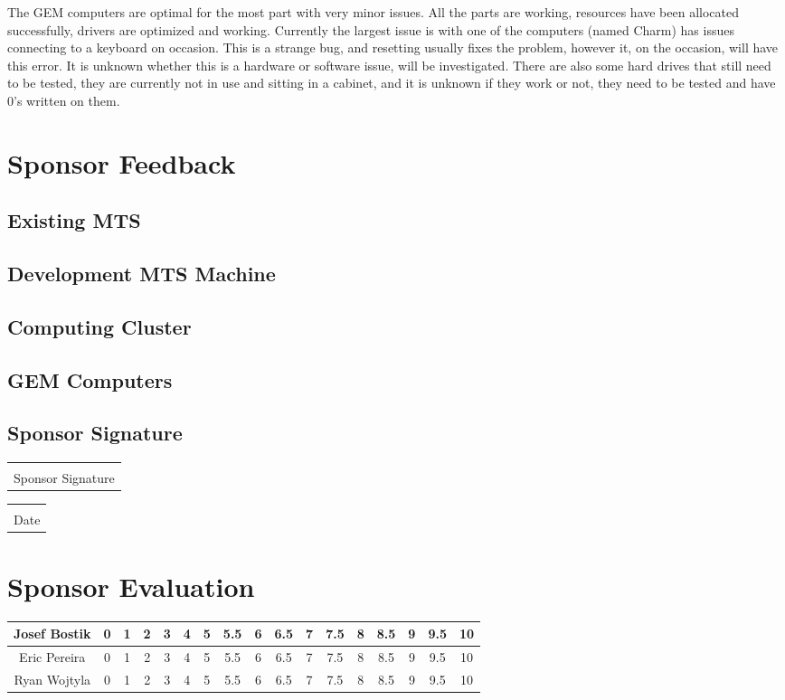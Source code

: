 \documentclass[12pt]{article}
\makeatletter
\newcommand\tab[1][1cm]{\hspace*{#1}}
\newcommand{\titledate}[2][2.5in]{%
	\noindent%
	\begin{tabular}{@{}p{#1}@{}}
		\\ \hline \\[-.75\normalbaselineskip]
		#2
	\end{tabular} \hspace{1in}
	\begin{tabular}{@{}p{#1}@{}}
		\\ \hline \\[-.75\normalbaselineskip]
		Date
	\end{tabular}
}
\makeatother
\begin{document}
\tab The GEM computers are optimal for the most part with very minor issues. All the parts are working, resources have been allocated successfully, drivers are optimized and working. Currently the largest issue is with one of the computers (named Charm) has issues connecting to a keyboard on occasion. This is a strange bug, and resetting usually fixes the problem, however it, on the occasion, will have this error. It is unknown whether this is a hardware or software issue, will be investigated. There are also some hard drives that still need to be tested, they are currently not in use and sitting in a cabinet, and it is unknown if they work or not, they need to be tested and have 0's written on them. 

\section{Sponsor Feedback}

\subsection{Existing MTS}

\vspace{1in}

\subsection{Development MTS Machine}

\vspace{1in}

\subsection{Computing Cluster}

\vspace{1in}

\subsection{GEM Computers}

\vspace{1in}

\subsection{Sponsor Signature}
\vspace{.5in}
\titledate{Sponsor Signature}

\section{Sponsor Evaluation}
\begin{tabular}{|c|c|c|c|c|c|c|c|c|c|c|c|c|c|c|c|c|}
	\hline
	Josef Bostik & 0 & 1 & 2 & 3 & 4 & 5 & 5.5 & 6 & 6.5 & 7 & 7.5 & 8 & 8.5 & 9 & 9.5 & 10\\
	\hline
	Eric Pereira & 0 & 1 & 2 & 3 & 4 & 5 & 5.5 & 6 & 6.5 & 7 & 7.5 & 8 & 8.5 & 9 & 9.5 & 10\\
	\hline
	Ryan Wojtyla & 0 & 1 & 2 & 3 & 4 & 5 & 5.5 & 6 & 6.5 & 7 & 7.5 & 8 & 8.5 & 9 & 9.5 & 10\\
	\hline
\end{tabular}
\end{document}
